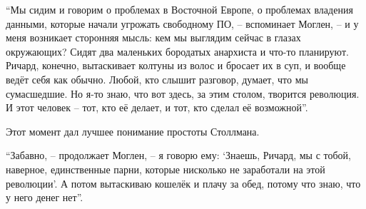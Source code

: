 \enquote{Мы сидим и говорим о проблемах в Восточной Европе, о проблемах владения данными, которые начали угрожать свободному ПО, -- вспоминает Моглен, -- и у меня возникает сторонняя мысль: кем мы выглядим сейчас в глазах окружающих? Сидят два маленьких бородатых анархиста и что-то планируют. Ричард, конечно, вытаскивает колтуны из волос и бросает их в суп, и вообще ведёт себя как обычно. Любой, кто слышит разговор, думает, что мы сумасшедшие. Но я-то знаю, что вот здесь, за этим столом, творится революция. И этот человек -- тот, кто её делает, и тот, кто сделал её возможной}.

Этот момент дал лучшее понимание простоты Столлмана.

\enquote{Забавно, -- продолжает Моглен, -- я говорю ему: \enquote{Знаешь, Ричард, мы с тобой, наверное, единственные парни, которые нисколько не заработали на этой революции}. А потом вытаскиваю кошелёк и плачу за обед, потому что знаю, что у него денег нет}.

\theendnotes
\setcounter{endnote}{0}
